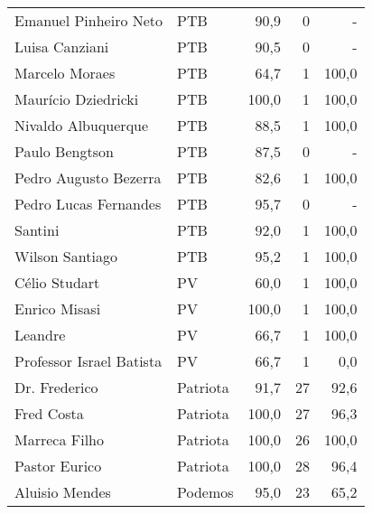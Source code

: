 \begin{longtable}{llrrr}
               Emanuel Pinheiro Neto &            PTB &      90,9 &            0 &          - \\
                      Luisa Canziani &            PTB &      90,5 &            0 &          - \\
                      Marcelo Moraes &            PTB &      64,7 &            1 &      100,0 \\
                 Maurício Dziedricki &            PTB &     100,0 &            1 &      100,0 \\
                 Nivaldo Albuquerque &            PTB &      88,5 &            1 &      100,0 \\
                      Paulo Bengtson &            PTB &      87,5 &            0 &          - \\
               Pedro Augusto Bezerra &            PTB &      82,6 &            1 &      100,0 \\
               Pedro Lucas Fernandes &            PTB &      95,7 &            0 &          - \\
                             Santini &            PTB &      92,0 &            1 &      100,0 \\
                     Wilson Santiago &            PTB &      95,2 &            1 &      100,0 \\
                       Célio Studart &             PV &      60,0 &            1 &      100,0 \\
                       Enrico Misasi &             PV &     100,0 &            1 &      100,0 \\
                             Leandre &             PV &      66,7 &            1 &      100,0 \\
            Professor Israel Batista &             PV &      66,7 &            1 &        0,0 \\
                       Dr. Frederico &       Patriota &      91,7 &           27 &       92,6 \\
                          Fred Costa &       Patriota &     100,0 &           27 &       96,3 \\
                       Marreca Filho &       Patriota &     100,0 &           26 &      100,0 \\
                       Pastor Eurico &       Patriota &     100,0 &           28 &       96,4 \\
                      Aluisio Mendes &        Podemos &      95,0 &           23 &       65,2 \\

\end{longtable}
